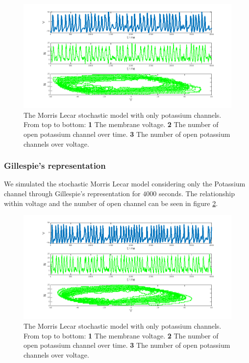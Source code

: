		\begin{figure}
			\includegraphics[width=\textwidth]{Figures/ml-rtc}
			\caption{The Morris Lecar stochastic model with only potassium channels. From top to bottom: \textbf{1} The membrane voltage. \textbf{2} The number of open potassium channel over time. \textbf{3} The number of open potassium channels over voltage.}
			\label{fig:ml-rtc}
		\end{figure}

		\subsubsection{Gillespie's representation}
		We simulated the stochastic Morris Lecar model considering only the Potassium channel through Gillespie's representation for $4000$ seconds.
		The relationship within voltage and the number of open channel can be seen in figure \ref{fig:ml-gill}.

		\begin{figure}
			\includegraphics[width=\textwidth]{Figures/ml-gill}
			\caption{The Morris Lecar stochastic model with only potassium channels. From top to bottom: \textbf{1} The membrane voltage. \textbf{2} The number of open potassium channel over time. \textbf{3} The number of open potassium channels over voltage.}
			\label{fig:ml-gill}
		\end{figure}
